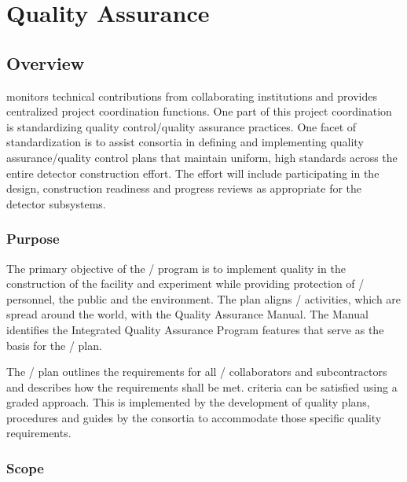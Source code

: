 \chapter{Quality Assurance}
\label{vl:tc-QA}

\section{Overview}

  monitors technical contributions from
collaborating institutions and provides centralized project
coordination functions. One part of this project
coordination is standardizing quality control/quality
assurance practices. One facet of standardization
is to assist consortia in defining and implementing
quality assurance/quality control plans that maintain uniform,
high standards across the entire detector construction
effort. The  effort will include participating in the
design, construction readiness and progress reviews as appropriate for
the  detector subsystems.

\subsection{Purpose}

The primary objective of the /   program
is to implement quality in the construction of the  facility and
 experiment while providing protection of / personnel, the
public and the environment. The  plan aligns /  
activities, which are spread around the world, with the \fnal
Quality Assurance Manual. The Manual identifies the \fnal
Integrated Quality Assurance Program features that serve as the basis
for the /  plan.

The /  plan outlines the 
requirements for all / collaborators and
subcontractors and describes how the requirements shall be met. 
criteria can be satisfied using a graded approach. This  is
implemented by the development of quality plans, procedures and guides
by the consortia to accommodate those specific quality requirements.

\subsection{Scope}


